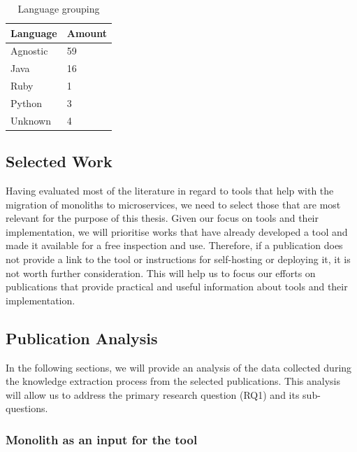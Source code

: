 \documentclass[conference]{IEEEtran}
\begin{document}
\begin{table}[!htb] \caption{Language grouping} \label{tab:language-grouping}
  \begin{center}
    \begin{tabular}[c]{p{12em}|p{4em}}
      \textbf{Language} &
      \textbf{Amount} \\
      \hline Agnostic & {59} \\
      \hline Java & {16} \\
      \hline Ruby & {1} \\
      \hline Python & {3} \\
      \hline Unknown & {4} \\
    \end{tabular}
  \end{center}
\end{table}

\subsection{Selected Work}

Having evaluated most of the literature in regard to tools that help with the
migration of monoliths to microservices, we need to select those that are most
relevant for the purpose of this thesis. Given our focus on tools and their
implementation, we will prioritise works that have already developed a tool and
made it available for a free inspection and use. Therefore, if a publication
does not provide a link to the tool or instructions for self-hosting or
deploying it, it is not worth further consideration. This will help us to focus
our efforts on publications that provide practical and useful information about
tools and their implementation.

\subsection{Publication Analysis} \label{sub:publication-analysis}

In the following sections, we will provide an analysis of the data collected
during the knowledge extraction process from the selected publications. This
analysis will allow us to address the primary research question (RQ1) and its
sub-questions.

\subsubsection{Monolith as an input for the tool}
\end{document}
